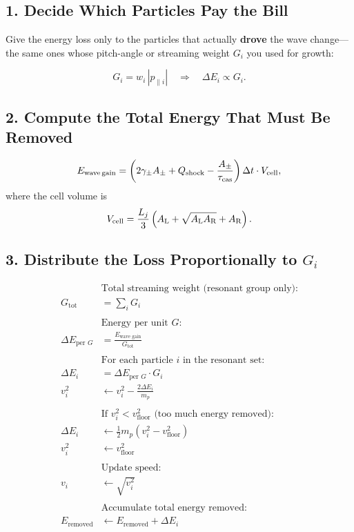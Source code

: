 \subsection*{1. Decide Which Particles Pay the Bill}

Give the energy loss only to the particles that actually \textbf{drove} the wave change—the same ones whose pitch-angle or streaming weight $G_i$ you used for growth:

\[
G_i = w_i\,|p_{\parallel i}| \quad\Longrightarrow\quad \Delta E_i \propto G_i.
\]

\subsection*{2. Compute the Total Energy That Must Be Removed}

\[
E_{\rm wave\,gain}
   = \left( 2\gamma_\pm A_\pm + Q_{\rm shock} - \frac{A_\pm}{\tau_{\rm cas}} \right)
     \Delta t \cdot V_{\rm cell},
\]
where the cell volume is
\[
V_{\rm cell} = \frac{L_j}{3} \left( A_{\rm L} + \sqrt{A_{\rm L} A_{\rm R}} + A_{\rm R} \right).
\]

\subsection*{3. Distribute the Loss Proportionally to $G_i$}

\begin{align*}
&\text{Total streaming weight (resonant group only):} \\
G_{\text{tot}} &= \sum_i G_i \\
\\
&\text{Energy per unit } G: \\
\Delta E_{\text{per } G} &= \frac{E_{\text{wave gain}}}{G_{\text{tot}}} \\
\\
&\text{For each particle } i \text{ in the resonant set:} \\
\Delta E_i &= \Delta E_{\text{per } G} \cdot G_i \\
v_i^2 &\leftarrow v_i^2 - \frac{2 \Delta E_i}{m_p} \\
\\
&\text{If } v_i^2 < v_{\text{floor}}^2 \text{ (too much energy removed):} \\
\Delta E_i &\leftarrow \tfrac{1}{2} m_p \left(v_i^2 - v_{\text{floor}}^2\right) \\
v_i^2 &\leftarrow v_{\text{floor}}^2 \\
\\
&\text{Update speed:} \\
v_i &\leftarrow \sqrt{v_i^2} \\
\\
&\text{Accumulate total energy removed:} \\
E_{\text{removed}} &\leftarrow E_{\text{removed}} + \Delta E_i
\end{align*}

